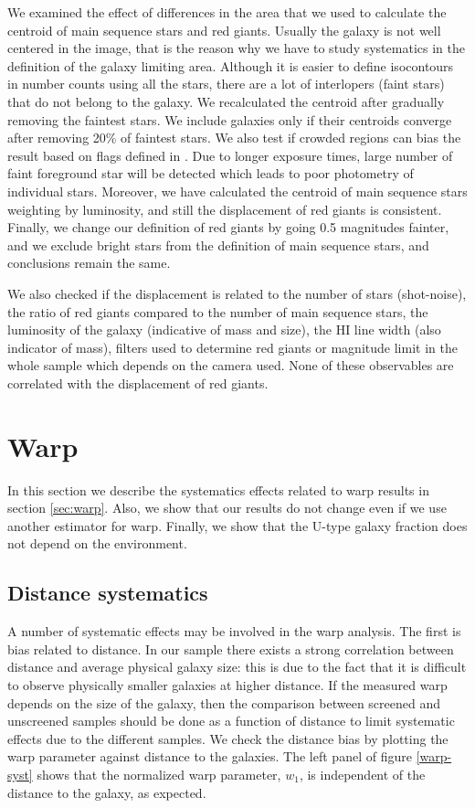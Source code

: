 \documentclass[useAMS,usenatbib,twocolumn]{mn2e}
\begin{document}
We examined the effect of differences in
the area that we used to calculate the centroid of main sequence stars and red
giants. Usually the galaxy is not well centered in the image, that is the
reason why we have to study systematics in the definition of 
the galaxy limiting area. Although it is easier to define isocontours in
number counts using all the stars, there are a lot of interlopers (faint stars)
that do not belong to the galaxy. We recalculated the centroid
after gradually removing the faintest stars. We include galaxies only if their
centroids converge after removing 20\% of faintest stars.
We also test if crowded regions can bias the result based on flags defined in
\citet{dalcanton09}. Due to longer exposure times, large number of faint
foreground star will be detected which leads to poor photometry of individual
stars. Moreover, we have calculated the centroid of main sequence stars
weighting by luminosity, and still the displacement of red giants is consistent.
Finally, we change our definition of red giants by going 0.5
magnitudes fainter, and we exclude bright stars from the definition of
main sequence stars, and conclusions remain the same. 


We also checked if the displacement is related to the number of stars
(shot-noise), the ratio of red giants compared to the number of main sequence
stars,
the luminosity of the galaxy (indicative of mass and size),  the HI line
width (also indicator of mass), filters used to determine red giants or
magnitude limit in the whole sample which depends on the
camera used. None of these observables are correlated with the
displacement of red giants.


\section{Warp}
\label{ap:warp}
In this section we describe the systematics effects related to warp results in
section \ref{sec:warp}. Also, we show that our results do not change even if we
use another estimator for warp. Finally, we show that the U-type galaxy
fraction does not depend on the environment. 

\subsection{Distance systematics}
\label{ap:distance-systematic}
A number of systematic effects may be involved in the warp analysis.
The first is bias related to distance.
In our sample there exists a strong correlation between
distance and average physical galaxy size:
this is due to the fact that it is difficult to observe physically
smaller galaxies at higher distance. If the measured warp depends on the
size of the galaxy, then the comparison between screened and unscreened
samples should be done as a function of distance to limit systematic effects
due to the different samples.
We check the distance bias by plotting the warp parameter against
distance to the galaxies. The left panel of figure \ref{warp-syst} shows that
the normalized warp parameter, $w_1$, is independent of the distance to
the galaxy, as expected.
\end{document}
